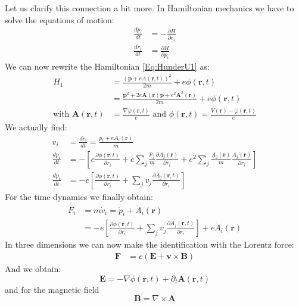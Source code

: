 \documentclass[10pt]{article}
\newcommand{\ch}{e}
\begin{document}
Let us clarify this connection a bit more. In Hamiltonian mechanics we have to solve the equations of motion:
\begin{eqnarray}
\frac{dp_i}{dt}&=-\frac{\partial H}{\partial r_i}\\
\frac{dr_i}{dt}&=\frac{\partial H}{\partial p_i}
\end{eqnarray}
We can now rewrite the Hamiltonian \eqref{Eq:HunderU1} as:
\begin{eqnarray}
H_1 &= \frac{(\mathbf{p}+\ch A(\mathbf{r},t))^2}{2m}+\ch\phi(\mathbf{r},t)\\
&= \frac{\mathbf{p}^2 +2\ch\mathbf{A}(\mathbf{r})\mathbf{p}+\ch^2\mathbf{A}^2(\mathbf{r})}{2m}+\ch\phi(\mathbf{r},t)\\
\text{with }\mathbf{A}(\mathbf{r},t) &=\frac{\nabla \varphi(\mathbf{r},t)}{\ch}\text{ and } \phi(\mathbf{r},t) =\frac{ V(\mathbf{r})-\dot{\varphi}(\mathbf{r},t) }{\ch}
\end{eqnarray}
We actually find:
\begin{eqnarray}
v_i &= \frac{dr_i}{dt}= \frac{p_i+\ch A_i(\mathbf{r})}{m}\\
\frac{dp_i}{dt}&= -\left[\ch\frac{\partial\phi(\mathbf{r},t)}{\partial r_i}+\ch\sum_j \frac{p_j}{m} \frac{\partial A_j(\mathbf{r})}{\partial r_i}+\ch^2\sum_j \frac{A_j(\mathbf{r})}{m}\frac{A_j(\mathbf{r})}{\partial r_i}\right]\\
\frac{dp_i}{dt}&= -\ch\left[\frac{\partial\phi(\mathbf{r},t)}{\partial r_i}+\sum_j v_j \frac{\partial A_j(\mathbf{r},t)}{\partial r_i}\right]
\end{eqnarray}
For the time dynamics we finally obtain:
\begin{eqnarray}
F_i &= m \dot{v}_i = \dot{p}_i+\dot{A}_i(\mathbf{r})\\
&= -\ch\left[\frac{\partial\phi(\mathbf{r},t)}{\partial r_i}+\sum_j v_j \frac{\partial A_j(\mathbf{r},t)}{\partial r_i}\right]+\ch\dot{A}_i(\mathbf{r})
\end{eqnarray}
In three dimensions we can now make the identification with the Lorentz force:
\begin{eqnarray}
\mathbf{F} &= \ch\left(\mathbf{E} + \mathbf{v}\times\mathbf{B}\right)
\end{eqnarray}
And we obtain:
\begin{equation}\label{Eq:DefElectricField}
\mathbf{E} = -\nabla \phi(\mathbf{r},t) + \partial_t \mathbf{A}(\mathbf{r},t)
\end{equation}
and for the magnetic field
\begin{equation}
\mathbf{B} = \nabla \times \mathbf{A}
\end{equation}
\end{document}

